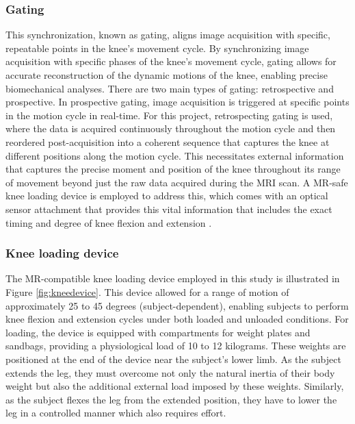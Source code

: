 \documentclass{micro-econ-thesis}
\begin{document}
\subsubsection{Gating} 

This synchronization, known as gating, aligns image acquisition with specific, repeatable points in the knee's movement cycle. By synchronizing image acquisition with specific phases of the knee's movement cycle, gating allows for accurate reconstruction of the dynamic motions of the knee, enabling precise biomechanical analyses. There are two main types of gating: retrospective and prospective. In prospective gating, image acquisition is triggered at specific points in the motion cycle in real-time. For this project, retrospecting gating is used, where the data is acquired continuously throughout the motion cycle \parencite{edelman_clinical_1996} and then reordered post-acquisition into a coherent sequence that captures the knee at different positions along the motion cycle. This necessitates external information that captures the precise moment and position of the knee throughout its range of movement beyond just the raw data acquired during the MRI scan. A MR-safe knee loading device is employed to address this, which comes with an optical sensor attachment that provides this vital information that includes the exact timing and degree of knee flexion and extension \parencite{brisson_novel_2022}. 

\subsubsection{Knee loading device }

The MR-compatible knee loading device employed in this study is illustrated in Figure \ref{fig:kneedevice}. This device allowed for a range of motion of approximately 25 to 45 degrees (subject-dependent), enabling subjects to perform knee flexion and extension cycles under both loaded and unloaded conditions. For loading, the device is equipped with compartments for weight plates and sandbags, providing a physiological load of 10 to 12 kilograms. These weights are positioned at the end of the device near the subject's lower limb. As the subject extends the leg, they must overcome not only the natural inertia of their body weight but also the additional external load imposed by these weights. Similarly, as the subject flexes the leg from the extended position, they have to lower the leg in a controlled manner which also requires effort. 
\end{document}
